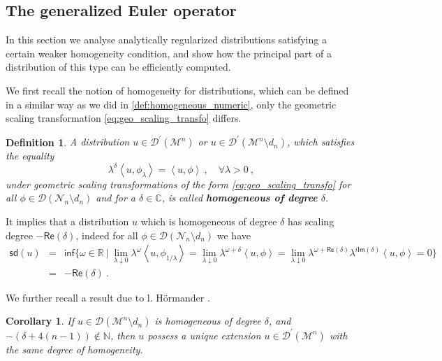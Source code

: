 \documentclass[11pt]{book}
\newcommand{\sd}{\mathsf{sd}}
\renewcommand{\Re}{\mathsf{Re}}
\renewcommand{\Im}{\mathsf{Im}}
\renewcommand{\inf}{\mathsf{inf}}
\newcommand{\sm}[1]{\left\langle#1\right\rangle}
\newcommand{\Dcal}{\mathcal{D}}
\newcommand{\Mcal}{\mathcal{M}}
\newcommand{\Ncal}{\mathcal{N}}
\newcommand{\Cbb}{\mathbb{C}}
\newcommand{\Nbb}{\mathbb{N}}
\newcommand{\Rbb}{\mathbb{R}}
\theoremstyle{break}
\newtheorem{corollary}{Corollary}[chapter]
\newtheorem{definition}{Definition}[chapter]
\begin{document}
\subsection{The generalized Euler operator}
\label{p:EULER}


In this section we analyse analytically regularized distributions satisfying a certain weaker homogeneity condition, and show how the principal part of a distribution of this type can be efficiently computed.

\bigskip


We first recall the notion of homogeneity for distributions, which can be defined in a similar way as we did in \ref{def:homogeneous_numeric}, only the geometric scaling transformation \eqref{eq:geo_scaling_transfo} differs.


\begin{definition}\label{def:homogeneous}
A distribution $u \in \Dcal^\prime(\Mcal^n)$ or $u\in \Dcal^\prime(\Mcal^n\setminus d_n)$, which satisfies the equality 
%
\begin{equation}
\lambda^{\delta} \sm{ u , \phi_\lambda } = \sm{ u , \phi } \ , \quad \forall \lambda > 0 \ , 
\label{eq:homo_distrib}
\end{equation}
%
under geometric scaling transformations of the form \eqref{eq:geo_scaling_transfo} for all $\phi\in\Dcal(\Ncal_n\setminus d_n)$ and for a $\delta\in\Cbb$, is called \textbf{homogeneous of degree} $\delta$. 
\end{definition}


It implies that a distribution $u$ which is homogeneous of degree $\delta$ has scaling degree $-\Re(\delta)$, indeed for all $\phi\in\Dcal(\Ncal_n\setminus d_n)$ we have
%
\begin{eqnarray*}
\sd(u) &=& \inf\bigg\{ \omega \in \Rbb \ \bigg| \ \lim_{\lambda \downarrow 0} \lambda^\omega \sm{u,\phi_{1/\lambda}} = \lim_{\lambda \downarrow 0} \lambda^{\omega+\delta} \sm{u,\phi} = \lim_{\lambda \downarrow 0} \lambda^{\omega+\Re(\delta)} \lambda^{i\Im(\delta)} \sm{u,\phi}
= 0  \bigg\} \\
&=& - \Re(\delta) \ .
\end{eqnarray*}


We further recall a result due to l. Hörmander \cite[theorem 3.2.3]{hormander_analysis_1990}.


\begin{corollary}\label{corol:exte_homo}
If $u\in\Dcal(\Mcal^n\setminus d_n)$ is homogeneous of degree $\delta$, and $-(\delta+4(n-1)) \notin \Nbb$, then $u$ possess a unique extension $u \in \Dcal^\prime(\Mcal^n)$ with the same degree of homogeneity.
\end{corollary}
\end{document}
